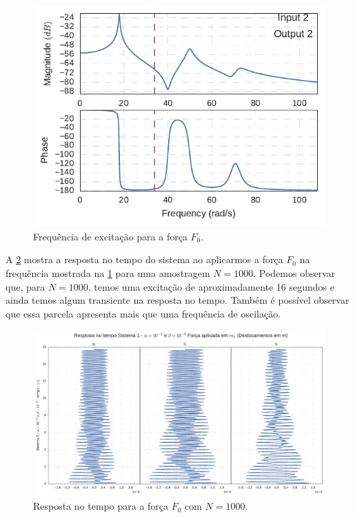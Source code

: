 \begin{figure}
	\centering
	\includegraphics[scale=1]{IMGS/FRF_i2_o2_freq34.pdf}
	\caption{Frequência de excitação para a força $F_0$.}
	\label{fig:FRF_i2_o2_freq34}
\end{figure}

A \cref{fig:F0_1000_tempo} mostra a resposta no tempo do sistema ao aplicarmos a força $F_0$ na frequência mostrada na \cref{fig:FRF_i2_o2_freq34} para uma amostragem $N = 1000$. Podemos observar que, para $N=1000$, temos uma excitação de aproximadamente 16 segundos e ainda temos algum transiente na resposta no tempo. Também é possível observar que essa parcela apresenta mais que uma frequência de oscilação.

\begin{figure}
	\centering
	\includegraphics[scale=0.6]{IMGS/F0_1000_tempo.pdf}
	\caption{Resposta no tempo para a força $F_0$ com $N=1000$.}
	\label{fig:F0_1000_tempo}
\end{figure}

